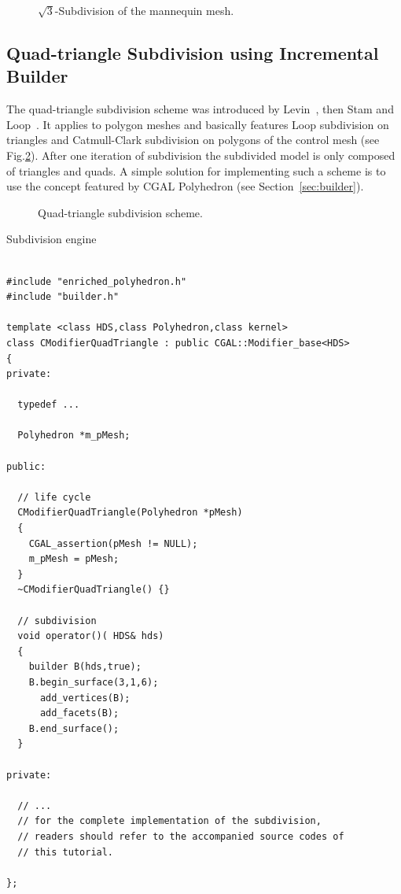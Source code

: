 \documentclass[letter,twoside,10pt]{article}
\begin{document}

\begin{figure}[htb]
    \caption{$\sqrt{3}$-Subdivision of the mannequin mesh.}
    \label{fig:sqrt3}
\end{figure}


\subsection{Quad-triangle Subdivision using Incremental Builder}

\label{sec:subdivision_builder}

The quad-triangle subdivision scheme was introduced by
Levin~\cite{l-pg-03}, then Stam and Loop~\cite{sl-qts-02}. It applies
to polygon meshes and basically features Loop subdivision on triangles
and Catmull-Clark subdivision on polygons of the control mesh (see
Fig.\ref{fig:quad-triangle}). After one iteration of subdivision the
subdivided model is only composed of triangles and quads. A simple
solution for implementing such a scheme is to use the
 concept featured by CGAL 
Polyhedron (see Section~\ref{sec:builder}).



\begin{figure}[htb]
    \caption{Quad-triangle subdivision scheme.}
    \label{fig:quad-triangle}
\end{figure}

Subdivision engine

{ \scriptsize
\begin{verbatim}

#include "enriched_polyhedron.h"
#include "builder.h"

template <class HDS,class Polyhedron,class kernel>
class CModifierQuadTriangle : public CGAL::Modifier_base<HDS>
{
private:

  typedef ...

  Polyhedron *m_pMesh;

public:

  // life cycle
  CModifierQuadTriangle(Polyhedron *pMesh)
  {
    CGAL_assertion(pMesh != NULL);
    m_pMesh = pMesh;
  }
  ~CModifierQuadTriangle() {}

  // subdivision
  void operator()( HDS& hds)
  {
    builder B(hds,true);
    B.begin_surface(3,1,6);
      add_vertices(B);
      add_facets(B);
    B.end_surface();
  }

private:

  // ... 
  // for the complete implementation of the subdivision, 
  // readers should refer to the accompanied source codes of 
  // this tutorial.
  
};
\end{verbatim}}
\end{document}

